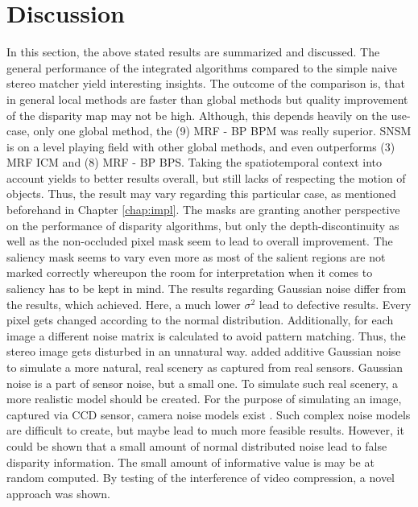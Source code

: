 \section{Discussion}

In this section, the above stated results are summarized and discussed.
The general performance of the integrated algorithms compared to the simple naive stereo matcher yield interesting insights.
The outcome of the comparison is, that in general local methods are faster than global methods but quality improvement of the disparity map may not be high.
Although, this depends heavily on the use-case, only one global method, the (9) MRF - BP BPM was really superior.
SNSM is on a level playing field with other global methods, and even outperforms (3) MRF ICM and (8) MRF - BP BPS.
Taking the spatiotemporal context into account yields to better results overall, but still lacks of respecting the motion of objects.
Thus, the result may vary regarding this particular case, as mentioned beforehand in Chapter \ref{chap:impl}.
The masks are granting another perspective on the performance of disparity algorithms, but only the depth-discontinuity as well as the non-occluded pixel mask seem to lead to overall improvement.
The saliency mask seems to vary even more as most of the salient regions are not marked correctly whereupon the room for interpretation when it comes to saliency has to be kept in mind.
\newline\newline\noindent The results regarding Gaussian noise differ from the results, which \citeauthor{richardt2010real} \citep{richardt2010real} achieved.
Here, a much lower $\sigma^2$ lead to defective results.
Every pixel gets changed according to the normal distribution.
Additionally, for each image a different noise matrix is calculated to avoid pattern matching.
Thus, the stereo image gets disturbed in an unnatural way.
\citeauthor{richardt2010real} added additive Gaussian noise to simulate a more natural, real scenery as captured from real sensors.
Gaussian noise is a part of sensor noise, but a small one.
To simulate such real scenery, a more realistic model should be created.
For the purpose of simulating an image, captured via CCD sensor, camera noise models exist \citep{liu2006noise}.
Such complex noise models are difficult to create, but maybe lead to much more feasible results.
However, it could be shown that a small amount of normal distributed noise lead to false disparity information.
The small amount of informative value is may be at random computed.
\newline\newline\noindent By testing of the interference of video compression, a novel approach was shown.

